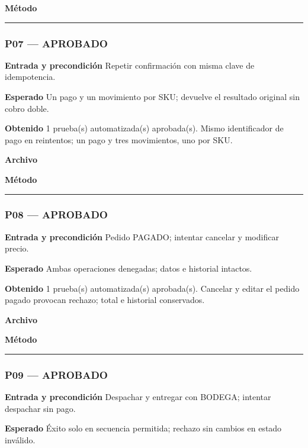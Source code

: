 \textbf{Método} 

\medskip\hrule\medskip
\subsubsection*{P07 --- APROBADO}
\textbf{Entrada y precondición} Repetir confirmación con misma clave de idempotencia.

\textbf{Esperado} Un pago y un movimiento por SKU; devuelve el resultado original sin cobro doble.

\textbf{Obtenido} 1 prueba(s) automatizada(s) aprobada(s). Mismo identificador de pago en reintentos; un pago y tres movimientos, uno por SKU.

\textbf{Archivo} \href{https://github.com/Alan77-bot/LogiMarket360Alan/blob/68bda51063441415524ede51bdf61649ee9b4973/tests/LogiMarket.Tests/Integracion/IdempotenciaTests.cs}{}

\textbf{Método} 

\medskip\hrule\medskip
\subsubsection*{P08 --- APROBADO}
\textbf{Entrada y precondición} Pedido PAGADO; intentar cancelar y modificar precio.

\textbf{Esperado} Ambas operaciones denegadas; datos e historial intactos.

\textbf{Obtenido} 1 prueba(s) automatizada(s) aprobada(s). Cancelar y editar el pedido pagado provocan rechazo; total e historial conservados.

\textbf{Archivo} \href{https://github.com/Alan77-bot/LogiMarket360Alan/blob/68bda51063441415524ede51bdf61649ee9b4973/tests/LogiMarket.Tests/Dominio/EstadosTests.cs}{}

\textbf{Método} 

\medskip\hrule\medskip
\subsubsection*{P09 --- APROBADO}
\textbf{Entrada y precondición} Despachar y entregar con BODEGA; intentar despachar sin pago.

\textbf{Esperado} Éxito solo en secuencia permitida; rechazo sin cambios en estado inválido.

